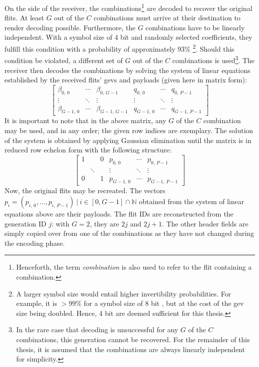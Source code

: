 On the side of the receiver, the combinations\footnote{Henceforth, the term \textit{combination} is also used to refer to the flit containing a
combination.} are decoded to recover the original flits. At least $G$ out of the $C$ combinations must arrive at their
destination to render decoding possible. Furthermore, the $G$ combinations have to be linearly independent. With a symbol size of 4 bit and randomly
selected coefficients, they fulfill this condition with a probability of approximately 93\% \cite[4]{franz18authdraft}\footnote{A larger symbol size would
entail higher invertibility probabilities. For example, it is $>99\%$ for a symbol size of 8 bit \cite[4]{franz18authdraft}, but at the cost of the
\gls{gev} size being doubled. Hence, 4 bit are deemed sufficient for this thesis.}. Should this condition be violated, a different set of $G$ out of
the $C$ combinations is used\footnote{In the rare case that decoding is unsuccessful for any $G$ of the $C$ combinations, this generation cannot be
recovered. For the remainder of this thesis, it is assumed that the combinations are always linearly independent for simplicity.}. The receiver then
decodes the combinations by solving the system of linear equations established by the received flits' \glspl{gev} and payloads (given here in matrix
form):
\[
    \begin{bmatrix}
        \beta_{0,\,0} & \cdots & \beta_{0,\,G-1} & q_{0,\,0} & \cdots & q_{0,\,P-1} \\
        \vdots & \ddots & \vdots & \vdots & \ddots & \vdots \\
        \beta_{G-1,\,0} & \cdots & \beta_{G-1,\,G-1} & q_{G-1,\,0} & \cdots & q_{G-1,\,P-1}
    \end{bmatrix}
\]
It is important to note that in the above matrix, any $G$ of the $C$ combination may be used, and in any order; the given row indices are exemplary. The
solution of the system is obtained by applying Gaussian elimination until the matrix is in reduced row echelon form with the following structure:
\[
    \begin{bmatrix}
        1 & & 0 & p_{0,\,0} & \cdots & p_{0,\,P-1} \\
        & \ddots & & \vdots & \ddots & \vdots \\
        0 & & 1 & p_{G-1,\,0} & \cdots & p_{G-1,\,P-1}
    \end{bmatrix}
\]
Now, the original flits may be recreated. The vectors $p_i = (p_{i,\,0}, …, p_{i,\,P-1})\ |\ i \in [0, G-1] \cap \mathbb{N}$ obtained from the system of linear
equations above are their payloads. The flit IDs are reconstructed from the generation ID $j$: with $G = 2$, they are $2j$ and $2j+1$. The other
header fields are simply copied over from one of the combinations as they have not changed during the encoding phase.

